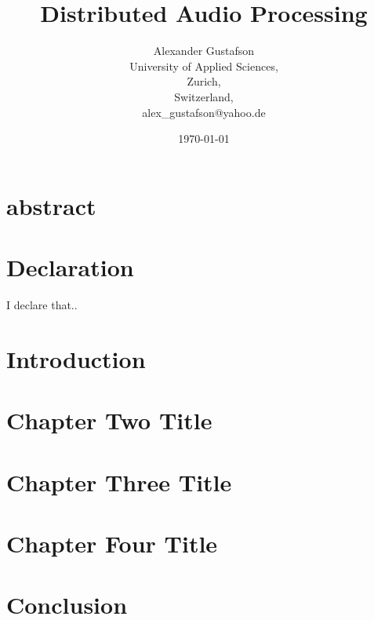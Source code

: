\documentclass{report}
\begin{document}
\title{Distributed Audio Processing}
\author{Alexander Gustafson\\
  University of Applied Sciences,\\
  Zurich,\\
  Switzerland,\\
  alex\_gustafson@yahoo.de}
\date{\today}
\maketitle

\chapter*{abstract}


\chapter*{Declaration}
I declare that..

\tableofcontents

\chapter{Introduction}


\chapter{Chapter Two Title}


\chapter{Chapter Three Title}


\chapter{Chapter Four Title}


\chapter{Conclusion}


{}

\end{document}
